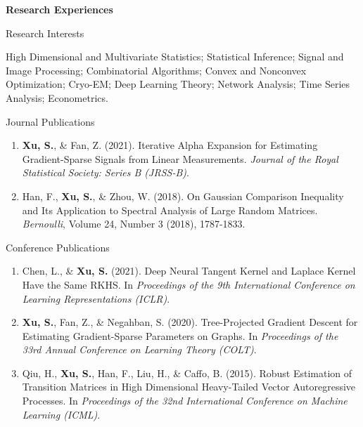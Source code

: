 \documentclass{article}
\begin{document}

\vspace{5mm}
\begin{large}
\noindent \textbf{Research Experiences}
\end{large}
\vspace{5mm}

\begin{large}
\noindent Research Interests
\end{large}

\vspace{3mm}



High Dimensional and Multivariate Statistics; Statistical Inference; Signal and Image Processing; Combinatorial Algorithms; Convex and Nonconvex Optimization; Cryo-EM; Deep Learning Theory; Network Analysis; Time Series Analysis; Econometrics.

\vspace{3mm}

\begin{large}
\noindent Journal Publications
\end{large}

\begin{enumerate}
\item \textbf{Xu, S.}, \& Fan, Z. (2021). Iterative Alpha Expansion for Estimating Gradient-Sparse Signals from Linear Measurements. \emph{Journal of the Royal Statistical Society: Series B (JRSS-B)}.
\item Han, F., \textbf{Xu, S.}, \& Zhou, W. (2018). On Gaussian Comparison Inequality and Its Application to Spectral Analysis of Large Random Matrices. \emph{Bernoulli}, Volume 24, Number 3 (2018), 1787-1833.
\end{enumerate}


\begin{large}
\noindent Conference Publications
\end{large}

\begin{enumerate}
\item Chen, L., \& \textbf{Xu, S.} (2021). Deep Neural Tangent Kernel and Laplace Kernel Have the Same RKHS. In \emph{Proceedings of the 9th International Conference on Learning Representations (ICLR)}.
\item \textbf{Xu, S.}, Fan, Z., \& Negahban, S. (2020). Tree-Projected Gradient Descent for Estimating Gradient-Sparse Parameters on Graphs.  In \emph{Proceedings of the 33rd Annual Conference on Learning Theory (COLT)}.
\item Qiu, H., \textbf{Xu, S.}, Han, F., Liu, H., \& Caffo, B. (2015). Robust Estimation of Transition Matrices in High Dimensional Heavy-Tailed Vector Autoregressive Processes. In \emph{Proceedings of the 32nd International
Conference on Machine Learning (ICML)}.
\end{enumerate}
\end{document}
